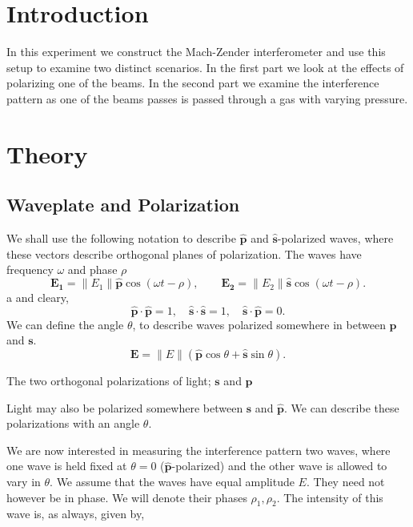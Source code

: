 \documentclass[working, oneside]{inputs/tuftebook}
\begin{document}

\section*{Introduction}
In this experiment we construct the Mach-Zender interferometer and use this setup to examine two distinct scenarios. In the first part we look at the effects of polarizing one of the beams. In the second part we examine the interference pattern as one of the beams passes is passed through a gas with varying pressure.
\section*{Theory}
\subsection*{Waveplate and Polarization}
We shall use the following notation to describe $\bm{\hat{p}}$ and $\bm{\hat{s}}$-polarized waves, where these vectors describe orthogonal planes of polarization. The waves have frequency $\omega$ and phase $\rho $
\[
\bm{E_1} = \|E_1\|\bm{\hat{p}}\cos\left( \omega t - \rho  \right) , \quad \quad \bm{E_2} = \|E_2\|\bm{\hat{s}}\cos\left( \omega t - \rho  \right) 
.\] a
and cleary,
\[
\bm{\hat{p}}\cdot\bm{\hat{p}}=1, \quad \bm{\hat{s}}\cdot\bm{\hat{s}}=1 ,\quad\bm{\hat{s}}\cdot\bm{\hat{p}}=0
.\] 
We can define the angle $\theta $, to describe waves polarized somewhere in between $\bm{p}$ and $\bm{s}$. 
\[
\bm{E} = \|E\|\left(\bm{\hat{p}} \cos\theta + \bm{\hat{s}}\sin \theta   \right) 
.\]
\begin{marginfigure}[-250pt]
    \caption{The two orthogonal polarizations of light; $\bm{s}$ and $\bm{p}$}
    \label{fig:pol}
\end{marginfigure}
\begin{marginfigure}[]
    \caption{Light may also be polarized somewhere between $\bm{\hat{s}}$ and $\bm{\hat{p}}$. We can describe these polarizations with an angle $\theta $. }
    \label{fig:pola2}
\end{marginfigure}
We are now interested in measuring the interference pattern two waves, where one wave is held fixed at $\theta = 0$ ($\bm{\hat{p}}$-polarized) and the other wave is allowed to vary in $\theta $. We assume that the waves have equal amplitude $E$. They need not however be in phase. We will denote their phases $\rho_1, \rho_2$. The intensity of this wave is, as always, given by,
\end{document}
